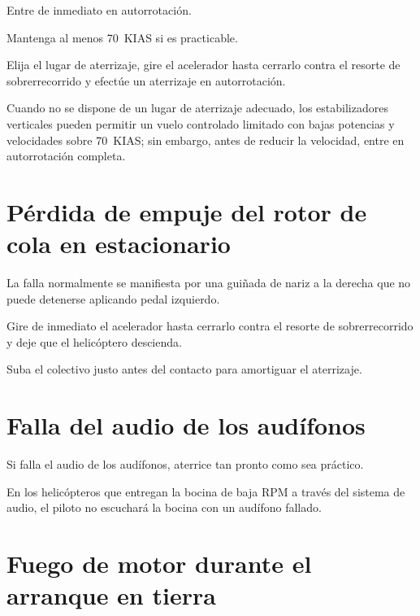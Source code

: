 \begin{pasos}
\item Entre de inmediato en autorrotación.
\item Mantenga al menos 70~KIAS si es practicable.
\item Elija el lugar de aterrizaje, gire el acelerador hasta cerrarlo contra el resorte de sobrerrecorrido y efectúe un aterrizaje en autorrotación.
\end{pasos}

\begin{nota}
Cuando no se dispone de un lugar de aterrizaje adecuado, los estabilizadores verticales pueden permitir un vuelo controlado limitado con bajas potencias y velocidades sobre 70~KIAS; sin embargo, antes de reducir la velocidad, entre en autorrotación completa.
\end{nota}

\section{Pérdida de empuje del rotor de cola en estacionario}

La falla normalmente se manifiesta por una guiñada de nariz a la derecha que no puede detenerse aplicando pedal izquierdo.

\begin{pasos}
\item Gire de inmediato el acelerador hasta cerrarlo contra el resorte de sobrerrecorrido y deje que el helicóptero descienda.
\item Suba el colectivo justo antes del contacto para amortiguar el aterrizaje.
\end{pasos}

\section{Falla del audio de los audífonos}

Si falla el audio de los audífonos, aterrice tan pronto como sea práctico.

\begin{precaucion}
En los helicópteros que entregan la bocina de baja RPM a través del sistema de audio, el piloto no escuchará la bocina con un audífono fallado.
\end{precaucion}

\section{Fuego de motor durante el arranque en tierra}


